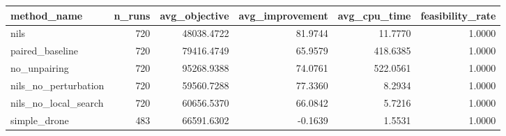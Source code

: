 \begin{tabular}{lrrrrr}
\toprule
method_name & n_runs & avg_objective & avg_improvement & avg_cpu_time & feasibility_rate \\
\midrule
nils & 720 & 48038.4722 & 81.9744 & 11.7770 & 1.0000 \\
paired_baseline & 720 & 79416.4749 & 65.9579 & 418.6385 & 1.0000 \\
no_unpairing & 720 & 95268.9388 & 74.0761 & 522.0561 & 1.0000 \\
nils_no_perturbation & 720 & 59560.7288 & 77.3360 & 8.2934 & 1.0000 \\
nils_no_local_search & 720 & 60656.5370 & 66.0842 & 5.7216 & 1.0000 \\
simple_drone & 483 & 66591.6302 & -0.1639 & 1.5531 & 1.0000 \\
\bottomrule
\end{tabular}
